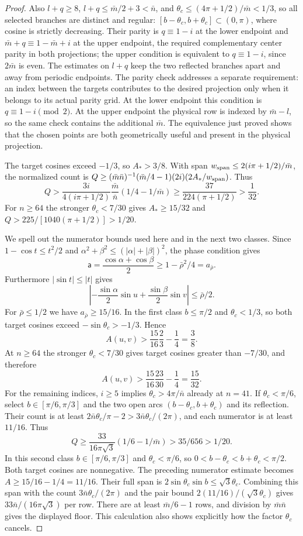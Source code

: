 \begin{proof}
Also $l+q\geq8$, $l+q\leq \bar{m}/2+3<\bar{n}$, and
$\theta_c\leq(4\pi+1/2)/\bar{m}<1/3$, so all selected branches are distinct
and regular: $[b-\theta_c,b+\theta_c]\subset(0,\pi)$,
where cosine is strictly decreasing. Their parity is $q\equiv1-i$ at the lower endpoint
and $\bar{m}+q\equiv1-\bar{m}+i$ at the upper endpoint, the required complementary
center parity in both projections; the upper condition is equivalent
to $q\equiv1-i$, since $2\bar m$ is even.
The estimates on $l+q$ keep the two reflected branches apart and
away from periodic endpoints.  The parity check addresses a separate
requirement: an index between the targets contributes to the desired
projection only when it belongs to its actual parity grid.  At the
lower endpoint this condition is $q\equiv1-i\pmod2$.  At the upper
endpoint the physical row is indexed by $\bar{m}-l$, so the same check
contains the additional $\bar{m}$. The equivalence just proved shows
that the chosen points are
both geometrically useful and present in the physical projection.

The target cosines exceed $-1/3$,
so $A_*>3/8$. With span $w_{\rm span}\leq2(i\pi+1/2)/\bar m$,
the normalized count is
$Q\geq(\bar m\bar n)^{-1}(\bar m/4-1)(2i)(2A_*/w_{\rm span})$.
Thus
\[
 Q>\frac{3i}{4(i\pi+1/2)}\frac {\bar{m}}{\bar{n}}(1/4-1/\bar{m})
 \geq\frac{37}{224(\pi+1/2)}>\frac1{32}.
\]
For $n\geq64$ the stronger $\theta_c<7/30$ gives $A_*\geq15/32$ and
$Q>225/[1040(\pi+1/2)]>1/20$.

We spell out the numerator bounds used here and in the next two
classes.  Since $1-\cos t\leq t^2/2$ and
$\alpha^2+\beta^2\leq(|\alpha|+|\beta|)^2$, the phase condition
gives
\[
 \mathsf{a}=\frac{\cos\alpha+\cos\beta}{2}\geq1-\bar{\rho}^2/4=a_{\bar{\rho}}.
\]
Furthermore $|\sin t|\leq|t|$ gives
\[
 \left| -\frac{\sin\alpha}{2}\sin u
              +\frac{\sin\beta}{2}\sin v\right|\leq \bar{\rho}/2.
\]
For $\bar{\rho}\leq1/2$ we have $a_{\bar{\rho}}\geq15/16$.  In the first class
$b\leq\pi/2$ and $\theta_c<1/3$, so both target cosines exceed
$-\sin\theta_c>-1/3$.  Hence
\[
 A(u,v)>\frac{15}{16}\frac23-\frac14=\frac38.
\]
At $n\geq64$ the stronger $\theta_c<7/30$ gives target cosines
greater than $-7/30$, and therefore
\[
 A(u,v)>\frac{15}{16}\frac{23}{30}-\frac14=\frac{15}{32}.
\]
For the remaining indices, $i\geq5$ implies $\theta_c>4\pi/\bar{n}$ already
at $n=41$.  If $\theta_c<\pi/6$, select $b\in[\pi/6,\pi/3]$ and the
two open arcs $(b-\theta_c,b+\theta_c)$ and its reflection.  Their count
is at least $2\bar{n}\theta_c/\pi-2>3\bar{n}\theta_c/(2\pi)$, and each numerator is
at least $11/16$.  Thus
\[
 Q\geq\frac{33}{16\pi\sqrt3}(1/6-1/\bar{m})>35/656>1/20.
\]
In this second class $b\in[\pi/6,\pi/3]$ and
$\theta_c<\pi/6$, so $0<b-\theta_c<b+\theta_c<\pi/2$.  Both target
cosines are nonnegative.  The preceding numerator estimate becomes
$A\geq15/16-1/4=11/16$.  Their full span is
$2\sin\theta_c\sin b\leq\sqrt3\theta_c$.  Combining this span
with the count $3\bar{n}\theta_c/(2\pi)$ and the pair bound
$2(11/16)/(\sqrt3\theta_c)$ gives $33\bar{n}/(16\pi\sqrt3)$ per row.
There are at least $\bar{m}/6-1$ rows, and division by $\bar{m}\bar{n}$ gives the
displayed floor.  This calculation also shows explicitly how the
factor $\theta_c$ cancels.


\end{proof}
